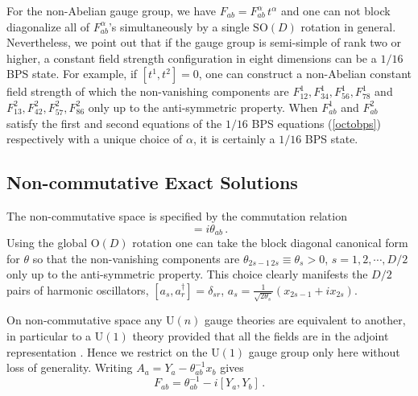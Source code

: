 \documentclass[a4paper,11pt]{article}
\begin{document}
For the non-Abelian gauge group, we have $F_{ab}=F^{\alpha}_{ab}\,t^{\alpha}$ and one can not block diagonalize  all of $F_{ab}^{\alpha}$'s
simultaneously by a single $\mbox{SO}(D)$ rotation in general. Nevertheless, we point out  that if the gauge group is  semi-simple of rank two or
higher,  a constant field  strength configuration in eight dimensions  can be a $1/16$ BPS state. For example, if $[t^{1},t^{2}]=0$,  one can
construct a non-Abelian constant field strength of which the non-vanishing components are  $F^{1}_{12},F^{1}_{34},F^{1}_{56},F^{1}_{78}$ and
$F^{2}_{13},F^{2}_{42},F^{2}_{57},F^{2}_{86}$ only up to the anti-symmetric property. When $F^{1}_{ab}$ and $F^{2}_{ab}$ satisfy the first and
second  equations of the $1/16$  BPS equations (\ref{octobps}) respectively  with a unique choice of $\alpha$, it is certainly a $1/16$ BPS state.



\subsection{Non-commutative Exact Solutions}

The non-commutative space is specified by the commutation relation
\begin{equation}
[x_{a},x_{b}]=i\theta_{ab}\,.
\end{equation}
Using the global $\mbox{O}(D)$ rotation one can take  the block diagonal canonical  form for $\theta$   so that the non-vanishing components are
$\theta_{{\scriptscriptstyle 2}s{\scriptscriptstyle -}\!{\scriptscriptstyle 1}\,{\scriptscriptstyle 2}s}\equiv\theta_{s}>0$, $s=1,2,\cdots,D/2$ only
up to the anti-symmetric property.  This choice clearly manifests  the  $D/2$ pairs of harmonic oscillators, $[a_{s},a^{\dagger}_{r}]=\delta_{sr}$,
$a_{s}=\frac{1}{\sqrt{2\theta_{s}}}(x_{{\scriptscriptstyle 2}s{\scriptscriptstyle -}\!{\scriptscriptstyle 1}}+ix_{{\scriptscriptstyle 2}s})$.



On  non-commutative space  any $\mbox{U}(n)$   gauge theories  are equivalent to another, in particular to a $\mbox{U}(1)$  theory provided that all
the fields are in the adjoint representation  \cite{comments}. Hence we  restrict on the $\mbox{U}(1)$ gauge group only here without loss of
generality. Writing $A_{a}=Y_{a}-\theta^{-1}_{ab}x_{b}$ gives
\begin{equation}
F_{ab}=\theta^{-1}_{ab}-i[Y_{a},Y_{b}]\,. \label{non-commF}
\end{equation}
\end{document}
